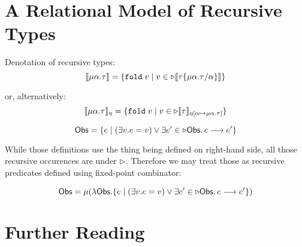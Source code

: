 \section{A Relational Model of Recursive Types}

Denotation of recursive types:
\[
  \llbracket\mu\alpha.\tau\rrbracket = \{\texttt{fold}\;v \mid v \in\triangleright\llbracket\tau\{\mu\alpha.\tau/\alpha\}\rrbracket \}
\]

or, alternatively:
\[
  \llbracket\mu\alpha.\tau\rrbracket_{\eta} = \{\texttt{fold}\;v \mid v \in\triangleright\llbracket\tau\rrbracket_{\eta[\alpha\mapsto \mu\alpha.\tau]} \}
\]

\[
  \mathsf{Obs} = \{ e \mid (\exists v.e=v) \lor \exists e' \in\triangleright\mathsf{Obs} \ldotp e \longrightarrow e' \}
\]

While those definitions use the thing being defined on right-hand side, all those recursive occurences are under $\triangleright$.
Therefore we may treat those as recursive predicates defined using fixed-point combinator:

\[
  \mathsf{Obs} = \mu(\lambda \mathsf{Obs}. \{ e \mid (\exists v.e=v) \lor \exists e' \in\triangleright\mathsf{Obs} \ldotp e \longrightarrow e' \})
\]
\section{Further Reading}
